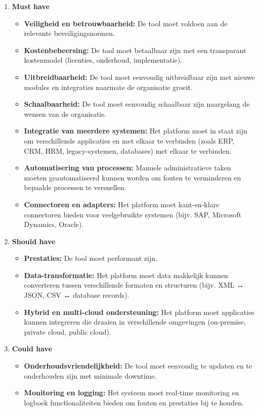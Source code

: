 \begin{enumerate}
    \item \textbf{Must have}
    \begin{itemize}
        \item \textbf{Veiligheid en betrouwbaarheid:} De tool moet voldoen aan de relevante beveiligingsnormen.
        \item \textbf{Kostenbeheersing:} De tool moet betaalbaar zijn met een transparant kostenmodel (licenties, onderhoud, implementatie).
        \item \textbf{Uitbreidbaarheid:} De tool moet eenvoudig uitbreidbaar zijn met nieuwe modules en integraties naarmate de organisatie groeit.
        \item \textbf{Schaalbaarheid:} De tool moet eenvoudig schaalbaar zijn naargelang de wensen van de organisatie.
        \item \textbf{Integratie van meerdere systemen:} Het platform moet in staat zijn om verschillende applicaties en met elkaar te verbinden (zoals ERP, CRM, HRM, legacy-systemen, databases) met elkaar te verbinden.
        \item \textbf{Automatisering van processen:} Manuele administratieve taken moeten geautomatiseerd kunnen worden om fouten te verminderen en bepaalde processen te versnellen.
        \item \textbf{Connectoren en adapters:} Het platform moet kant-en-klare connectoren bieden voor veelgebruikte systemen (bijv. SAP, Microsoft Dynamics, Oracle).
    \end{itemize}
    \item \textbf{Should have}
    \begin{itemize}
        \item \textbf{Prestaties:} De tool moet performant zijn.
        \item \textbf{Data-transformatie:} Het platform moet data makkelijk kunnen converteren tussen verschillende formaten en structuren (bijv. XML ↔ JSON, CSV ↔ database records).
        \item \textbf{Hybrid en multi-cloud ondersteuning:} Het platform moet applicaties kunnen integreren die draaien in verschillende omgevingen (on-premise, private cloud, public cloud).
    \end{itemize}
    \item \textbf{Could have}
    \begin{itemize}
        \item \textbf{Onderhoudsvriendelijkheid:} De tool moet eenvoudig te updaten en te onderhouden zijn met minimale downtime.
        \item \textbf{Monitoring en logging:} Het systeem moet real-time monitoring en logboek functionaliteiten bieden om fouten en prestaties bij te houden.
    \end{itemize}
\end{enumerate}

